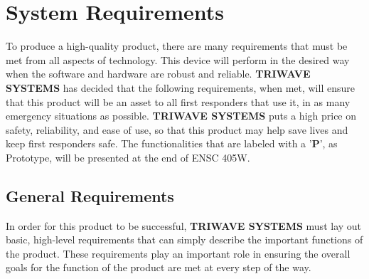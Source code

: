 \documentclass[11pt]{article}
\begin{document}
\setcounter{section}{2}
\section{System Requirements}
To produce a high-quality product, there are many requirements that must be met from all aspects of technology. This device will perform in the desired way when the software and hardware are robust and reliable. \textbf{TRIWAVE SYSTEMS} has decided that the following requirements, when met, will ensure that this product will be an asset to all first responders that use it, in as many emergency situations as possible. \textbf{TRIWAVE SYSTEMS} puts a high price on safety, reliability, and ease of use, so that this product may help save lives and keep first responders safe. The functionalities that are labeled with a '\textbf{P}', as Prototype, will be presented at the end of ENSC 405W.


\break
\subsection{General Requirements}
In order for this product to be successful, \textbf{TRIWAVE SYSTEMS} must lay out basic, high-level requirements that can simply describe the important functions of the product. These requirements play an important role in ensuring the overall goals for the function of the product are met at every step of the way.
\end{document}
